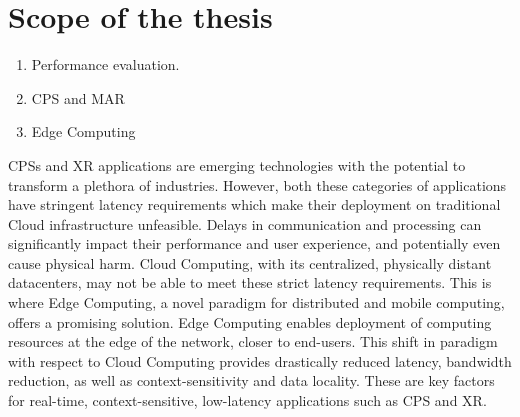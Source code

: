 \section{Scope of the thesis}
\glsresetall%




\begin{enumerate}
    \item Performance evaluation.
    \item \gls{CPS} and \gls{MAR}
    \item Edge Computing 
\end{enumerate}

\glsresetall%
\glspl{CPS} and \gls{XR} applications are emerging technologies with the potential to transform a plethora of industries.
However, both these categories of applications have stringent latency requirements which make their deployment on traditional Cloud infrastructure unfeasible.
Delays in communication and processing can significantly impact their performance and user experience, and potentially even cause physical harm.
Cloud Computing, with its centralized, physically distant datacenters, may not be able to meet these strict latency requirements.
This is where Edge Computing, a novel paradigm for distributed and mobile computing, offers a promising solution.
Edge Computing enables deployment of computing resources at the edge of the network, closer to end-users.
This shift in paradigm with respect to Cloud Computing provides drastically reduced latency, bandwidth reduction, as well as context-sensitivity and data locality.
These are key factors for real-time, context-sensitive, low-latency applications such as \gls{CPS} and \gls{XR}.

